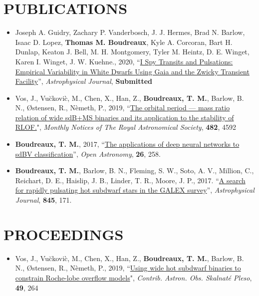 \documentclass[margin, 10pt]{res} %
\begin{document}
\begin{resume}
\section{PUBLICATIONS}
\begin{itemize}
	\item Joseph A. Guidry, Zachary P. Vanderbosch, J. J. Hermes, Brad N. Barlow, Isaac D. Lopez, \textbf{Thomas M. Boudreaux}, Kyle A. Corcoran, Bart H. Dunlap, Keaton J. Bell, M. H. Montgomery, Tyler M. Heintz, D. E. Winget, Karen I. Winget, J. W. Kuehne., 2020, ``\href{https://ui.adsabs.harvard.edu/abs/2020arXiv201200035G/abstract}{I Spy Transits and Pulsations: Empirical Variability in White Dwarfs Using Gaia and the Zwicky Transient Facility}'', \textit{Astrophysical Journal}, \textbf{Submitted}
\item Vos, J., Vu\u{c}kovi\`c, M., Chen, X., Han, Z., \textbf{Boudreaux, T. M.}, Barlow, B. N., \O stensen, R., N\`emeth, P., 2019, ``\href{https://ui.adsabs.harvard.edu/#abs/2019MNRAS.482.4592V/abstract}{The orbital period --- mass ratio relation of wide sdB+MS binaries and its application to the stability of RLOF.}", \textit{Monthly Notices of The Royal Astronomical Society}, \textbf{482}, 4592 
\item \textbf{Boudreaux, T. M.}, 2017, ``\href{https://ui.adsabs.harvard.edu/#abs/2017OAst...26..258B/abstract}{The applications of deep neural networks to sdBV classification}'', \textit{Open Astronomy}, \textbf{26}, 258.
\item \textbf{Boudreaux, T. M.}, Barlow, B. N., Fleming, S. W., Soto, A. V., Million, C., Reichart, D. E., Haislip, J. B., Linder, T. R., Moore, J. P., 2017. ``\href{https://ui.adsabs.harvard.edu/#abs/2017ApJ...845..171B/abstract}{A search for rapidly pulsating hot subdwarf stars in the GALEX survey}'', \textit{Astrophysical Journal}, \textbf{845}, 171.
\end{itemize}

\section{PROCEEDINGS}
\begin{itemize}
\item Vos, J., Vu\u{c}kovi\`c, M., Chen, X., Han, Z., \textbf{Boudreaux, T. M.}, Barlow, B. N., \O stensen, R., N\`emeth, P., 2019, ``\href{http://www.ta3.sk/caosp/Eedition/FullTexts/vol49no2/pp264-270.pdf}{Using wide hot subdwarf binaries to constrain Roche-lobe overflow models}", \textit{Contrib. Astron. Obs. Skalnaté Pleso}, \textbf{49}, 264 
\end{itemize}


\end{resume}
\end{document}
